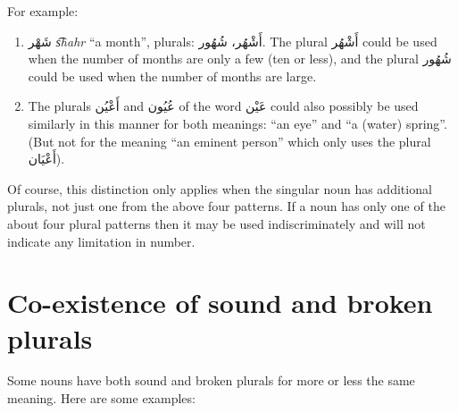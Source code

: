 \documentclass[
  10pt,
]{book}
\providecommand{\tightlist}{%
  \setlength{\itemsep}{0pt}\setlength{\parskip}{0pt}}
\begin{document}
\begin{enumerate}
  For example:

  \begin{enumerate}
  \def\labelenumii{\roman{enumii}.}
  \tightlist
  \item
    \foreignlanguage{arabic}{شَهْر} \emph{s͡hahr} \enquote{a month}, plurals: \foreignlanguage{arabic}{أَشْهُر، شُهُور}. The plural \foreignlanguage{arabic}{أَشْهُر} could be used when the number of months are only a few (ten or less), and the plural \foreignlanguage{arabic}{شُهُور} could be used when the number of months are large.
  \item
    The plurals \foreignlanguage{arabic}{أَعْيُن} and \foreignlanguage{arabic}{عُيُون} of the word \foreignlanguage{arabic}{عَيْن} could also possibly be used similarly in this manner for both meanings: \enquote{an eye} and \enquote{a (water) spring}. (But not for the meaning \enquote{an eminent person} which only uses the plural \foreignlanguage{arabic}{أَعْيَان}).
  \end{enumerate}

  Of course, this distinction only applies when the singular noun has additional plurals, not just one from the above four patterns. If a noun has only one of the about four plural patterns then it may be used indiscriminately and will not indicate any limitation in number.
\end{enumerate}

\section{Co-existence of sound and broken plurals}\label{co-existence-of-sound-and-broken-plurals}

Some nouns have both sound and broken plurals for more or less the same meaning. Here are some examples:
\end{document}
